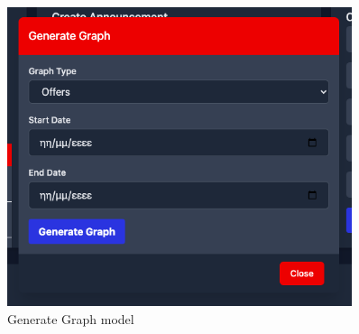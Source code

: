     \vspace{-1em}
    \begin{figure}[H] \noindent \centering
        \includegraphics[width=0.9\textwidth]{img/admin-generate_graph}
        \vspace{-1em}
        \caption{Generate Graph model}
    \end{figure}
